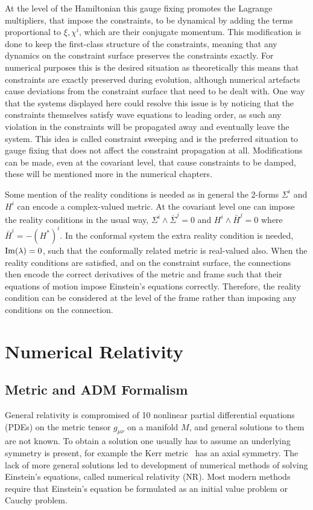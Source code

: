 \documentclass[10pt]{report}
\theoremstyle{definition}
\newcommand{\asd}[0]{\overline{\Sigma}}
\begin{document}
    At the level of the Hamiltonian this gauge fixing promotes the Lagrange multipliers, that impose the constraints, to be dynamical by adding the terms proportional to $\xi, \chi^i$, which are their conjugate momentum. This modification is done to keep the first-class structure of the constraints, meaning that any dynamics on the constraint surface preserves the constraints exactly. For numerical purposes this is the desired situation as theoretically this means that constraints are exactly preserved during evolution, although numerical artefacts cause deviations from the constraint surface that need to be dealt with. One way that the systems displayed here could resolve this issue is by noticing that the constraints themselves satisfy wave equations to leading order, as such any violation in the constraints will be propagated away and eventually leave the system. This idea is called constraint sweeping and is the preferred situation to gauge fixing that does not affect the constraint propagation at all. Modifications can be made, even at the covariant level, that cause constraints to be damped, these will be mentioned more in the numerical chapters.

    Some mention of the reality conditions is needed as in general the 2-forms $\Sigma^i$ and $H^i$ can encode a complex-valued metric. At the covariant level one can impose the reality conditions in the usual way, $\Sigma^i \wedge \asd^j = 0$ and $H^i \wedge \bar{H}^j = 0$ where $\bar{H}^i = -(H^*)^i$. In the conformal system the extra reality condition is needed, ${\rm Im}(\lambda) = 0$, such that the conformally related metric is real-valued also. When the reality conditions are satisfied, and on the constraint surface, the connections then encode the correct derivatives of the metric and frame such that their equations of motion impose Einstein's equations correctly. Therefore, the reality condition can be considered at the level of the frame rather than imposing any conditions on the connection.


    \newpage
    \part{Numerical Relativity}\label{part:numerical-relativity}

    \newpage
\chapter{Metric and ADM Formalism}\label{chap:numerical-relativity}
General relativity is compromised of 10 nonlinear partial differential equations (PDEs) on the metric tensor $g_{\mu\nu}$ on a manifold $M$, and general solutions to them are not known. To obtain a solution one usually has to assume an underlying symmetry is present, for example the Kerr metric~\cite{GravitationalFKerr1963} has an axial symmetry. The lack of more general solutions led to development of numerical methods of solving Einstein's equations, called numerical relativity (NR). Most modern methods require that Einstein's equation be formulated as an initial value problem or Cauchy problem.
\end{document}
